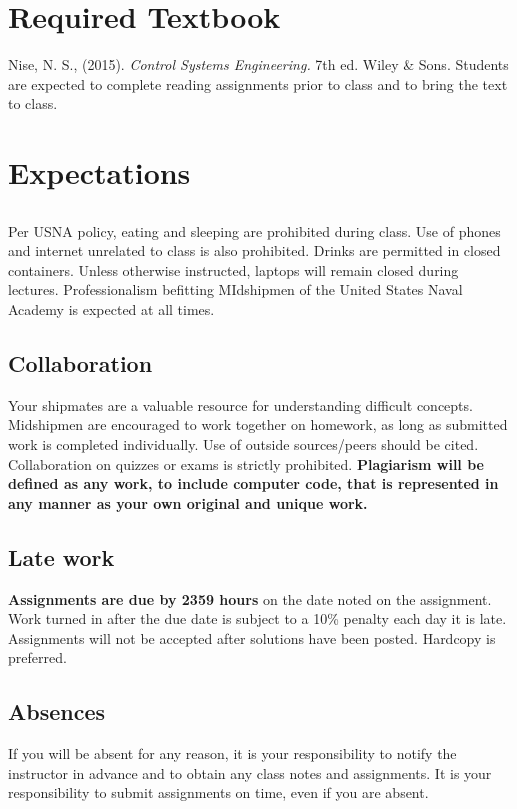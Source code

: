 \documentclass[11pt,courier]{navymemo}
\begin{document}
\section{Required Textbook} Nise, N. S., (2015). \emph{Control Systems Engineering.} 7th ed. Wiley \& Sons.  Students are expected to complete reading assignments prior to class and to bring the text to class.

\section{Expectations}
\subsection{} Per USNA policy, eating and sleeping are prohibited during class. Use of phones and internet unrelated to class is also prohibited.  Drinks are permitted in closed containers.  Unless otherwise instructed, laptops will remain closed during lectures.  Professionalism befitting MIdshipmen of the United States Naval Academy is expected at all times. 
\subsection{Collaboration} Your shipmates are a valuable resource for understanding difficult concepts. Midshipmen are encouraged to work together on homework, as long as submitted work is completed individually. Use of outside sources/peers should be cited. Collaboration on quizzes or exams is strictly prohibited. \textbf{Plagiarism will be defined as any work, to include computer code, that is represented in any manner as your own original and unique work.}
\subsection{Late work} \textbf{Assignments are due by 2359 hours} on the date noted on the assignment.  Work turned in after the due date is subject to a 10\% penalty each day it is late. Assignments will not be accepted after solutions have been posted. Hardcopy is preferred.  
\subsection{Absences} If you will be absent for any reason, it is your responsibility to notify the instructor in advance and to obtain any class notes and assignments. It is your responsibility to submit assignments on time, even if you are absent. 
\end{document}

